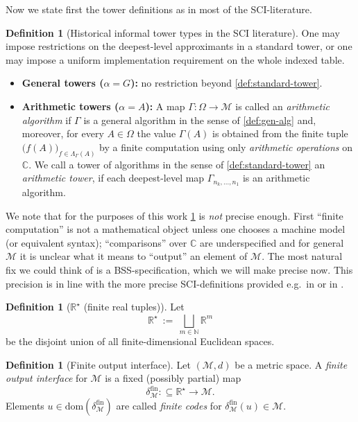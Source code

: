 \documentclass{lmcs} %
\theoremstyle{plain}
\theoremstyle{plain}
\theoremstyle{definition}
\newtheorem{definition}[theorem]{Definition}
\theoremstyle{remark}
\theoremstyle{definition}
\theoremstyle{remark}
\numberwithin{equation}{section}
\newcommand{\R}{\mathbb{R}}
\newcommand{\N}{\mathbb{N}}
\newcommand{\C}{\mathbb{C}}
\newcommand{\dom}{\mathrm{dom}}
\begin{document}
Now we state first the tower definitions as in most of the SCI-literature.
\begin{definition}[Historical informal tower types in the SCI literature]\label{def:tower-types}
One may impose restrictions on the deepest-level approximants in a standard tower, or one may impose a uniform implementation requirement on the whole indexed table.
\begin{itemize}
\item \textbf{General towers ($\alpha=G$):} no restriction beyond \cref{def:standard-tower}.
\item \textbf{Arithmetic towers ($\alpha=A$):} A map $\Gamma:\Omega\to\mathcal{M}$ is called an \textit{arithmetic algorithm} if
$\Gamma$ is a general algorithm in the sense of \cref{def:gen-alg} and, moreover,
for every $A\in\Omega$ the value $\Gamma(A)$ is obtained from the finite tuple
$\bigl(f(A)\bigr)_{f\in\Lambda_\Gamma(A)}$ by a finite computation using only
\textit{arithmetic operations} on $\C$. We call a tower of algorithms in the sense of \cref{def:standard-tower} an \textit{arithmetic tower}, 
if each deepest-level map $\Gamma_{n_k,\ldots,n_1}$ is an arithmetic algorithm.
\end{itemize}
\end{definition}

We note that for the purposes of this work \cref{def:tower-types} is \textit{not} precise enough. First \enquote{finite computation} is not a mathematical object unless one chooses a machine model (or equivalent syntax); \enquote{comparisons} over $\C$ are underspecified and for general $\mathcal M$ it is unclear what it means to \enquote{output} an element of $\mathcal M$. The most natural fix we could think of is a BSS-specification, which we will make precise now. This precision is in line with the more precise SCI-definitions provided e.g.\ in \cite[\S 2]{colbrook2020foundations} or in \cite[\S 6]{ben2015computing}.

\begin{definition}[$\R^\star$ (finite real tuples)]\label{def:Rstar}
Let
\[
\R^\star \ :=\ \bigsqcup_{m\in\N} \R^m
\]
be the disjoint union of all finite-dimensional Euclidean spaces.
\end{definition}

\begin{definition}[Finite output interface]\label{def:finite-output-interface}
Let $(\mathcal{M},d)$ be a metric space.
A \textit{finite output interface} for $\mathcal{M}$ is a fixed (possibly partial) map
\[
\delta^{\mathrm{fin}}_{\mathcal{M}}:\subseteq \R^\star \to \mathcal{M}.
\]
Elements $u\in\dom(\delta^{\mathrm{fin}}_{\mathcal{M}})$ are called \textit{finite codes} for
$\delta^{\mathrm{fin}}_{\mathcal{M}}(u)\in\mathcal{M}$.
\end{definition}
\end{document}
